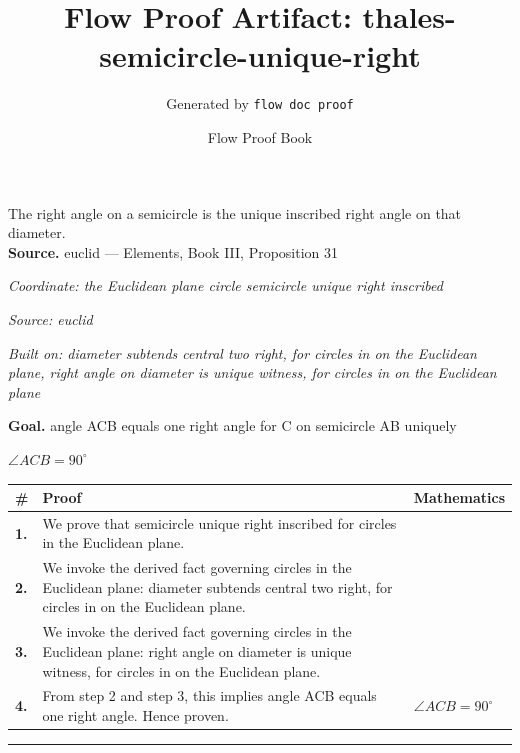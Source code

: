 \documentclass[11pt]{article}
\title{Flow Proof Artifact: thales-semicircle-unique-right}
\author{Generated by \texttt{flow doc proof}}
\date{Flow Proof Book}
\theoremstyle{definition}
\begin{document}
\maketitle
The right angle on a semicircle is the unique inscribed right angle on that diameter.\\[0.5em]
\textbf{Source.} euclid — Elements, Book III, Proposition 31\\[0.5em]
\bigskip
{}\par
\smallskip\noindent\textit{Coordinate: the Euclidean plane \cdot circle \cdot semicircle unique right inscribed}\par
\smallskip\noindent\textit{Source: euclid}\par
\smallskip\noindent\textit{Built on: diameter subtends central two right, for circles in on the Euclidean plane, right angle on diameter is unique witness, for circles in on the Euclidean plane}\par
\medskip
\noindent\textbf{Goal.} angle ACB equals one right angle for C on semicircle AB uniquely\par
\noindent$\displaystyle \angle ACB = 90^\circ$\par
\medskip
\noindent
\begin{tabular}{@{} >{\raggedright\arraybackslash}p{} >{\raggedright\arraybackslash}p{} >{\raggedleft\arraybackslash}p{} @{}}
\textbf{\#} & \textbf{Proof} & \textbf{Mathematics} \\
\midrule
\textbf{1.} & We prove that semicircle unique right inscribed for circles in the Euclidean plane. & \\[0.45em]
\textbf{2.} & We invoke the derived fact governing circles in the Euclidean plane: diameter subtends central two right, for circles in on the Euclidean plane. & \\[0.45em]
\textbf{3.} & We invoke the derived fact governing circles in the Euclidean plane: right angle on diameter is unique witness, for circles in on the Euclidean plane. & \\[0.45em]
\textbf{4.} & From step 2 and step 3, this implies angle ACB equals one right angle. Hence proven. & $\displaystyle \angle ACB = 90^\circ$ \\[0.45em]
\bottomrule
\end{tabular}
\label{thm:Geometry-circle-semicircle_unique_right_inscribed}
\par\medskip\hrule
\end{document}
